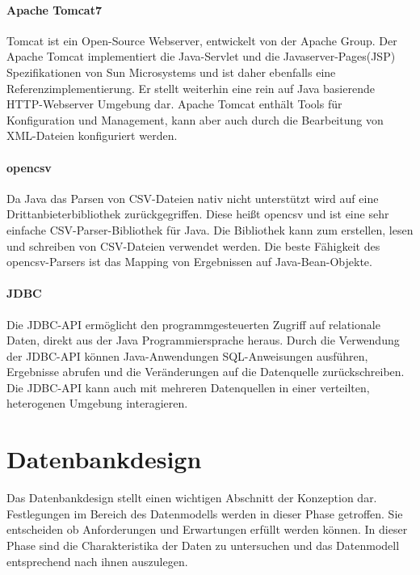 \paragraph{Apache Tomcat7}

Tomcat ist ein Open-Source Webserver, entwickelt von der Apache Group. Der Apache Tomcat implementiert die Java-Servlet und die Javaserver-Pages(JSP) Spezifikationen von Sun Microsystems und ist daher ebenfalls eine Referenzimplementierung. Er stellt weiterhin eine rein auf Java basierende HTTP-Webserver Umgebung dar. Apache Tomcat enthält Tools für Konfiguration und Management, kann aber auch durch die Bearbeitung von XML-Dateien konfiguriert werden.

\paragraph{opencsv}

Da Java das Parsen von CSV-Dateien nativ nicht unterstützt wird auf eine Drittanbieterbibliothek zurückgegriffen. Diese heißt opencsv und ist eine sehr einfache CSV-Parser-Bibliothek für Java. Die Bibliothek kann zum erstellen, lesen und schreiben von CSV-Dateien verwendet werden. Die beste Fähigkeit des opencsv-Parsers ist das Mapping von Ergebnissen auf Java-Bean-Objekte.

\paragraph{JDBC}

Die JDBC-API ermöglicht den programmgesteuerten Zugriff auf relationale Daten, direkt aus der Java Programmiersprache heraus. Durch die Verwendung der JDBC-API können Java-Anwendungen SQL-Anweisungen ausführen, Ergebnisse abrufen und die Veränderungen auf die Datenquelle zurückschreiben. Die JDBC-API kann auch mit mehreren Datenquellen in einer verteilten, heterogenen Umgebung interagieren. 

\section{Datenbankdesign}

Das Datenbankdesign stellt einen wichtigen Abschnitt der Konzeption dar. Festlegungen im Bereich des Datenmodells werden in dieser Phase getroffen. Sie entscheiden ob Anforderungen und Erwartungen erfüllt werden können. In dieser Phase sind die Charakteristika der Daten zu untersuchen und das Datenmodell entsprechend nach ihnen auszulegen.

